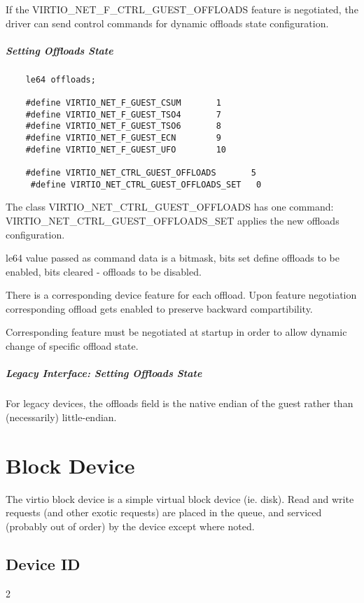 If the VIRTIO_NET_F_CTRL_GUEST_OFFLOADS feature is negotiated, the driver can
send control commands for dynamic offloads state configuration.

\subparagraph{Setting Offloads State}\label{sec:Device Types / Network Device / Device Operation / Control Virtqueue / Offloads State Configuration / Setting Offloads State}

\begin{lstlisting}
	le64 offloads;

	#define VIRTIO_NET_F_GUEST_CSUM       1
	#define VIRTIO_NET_F_GUEST_TSO4       7
	#define VIRTIO_NET_F_GUEST_TSO6       8
	#define VIRTIO_NET_F_GUEST_ECN        9
	#define VIRTIO_NET_F_GUEST_UFO        10

	#define VIRTIO_NET_CTRL_GUEST_OFFLOADS       5
	 #define VIRTIO_NET_CTRL_GUEST_OFFLOADS_SET   0
\end{lstlisting}

The class VIRTIO_NET_CTRL_GUEST_OFFLOADS has one command:
VIRTIO_NET_CTRL_GUEST_OFFLOADS_SET applies the new offloads configuration.

le64 value passed as command data is a bitmask, bits set define
offloads to be enabled, bits cleared - offloads to be disabled.

There is a corresponding device feature for each offload. Upon feature
negotiation corresponding offload gets enabled to preserve backward
compartibility.

Corresponding feature must be negotiated at startup in order to allow dynamic
change of specific offload state.


\subparagraph{Legacy Interface: Setting Offloads State}\label{sec:Device Types / Network Device / Device Operation / Control Virtqueue / Offloads State Configuration / Setting Offloads State / Legacy Interface: Setting Offloads State}
For legacy devices, the offloads field is the
native endian of the guest rather than (necessarily) little-endian.


\section{Block Device}\label{sec:Device Types / Block Device}

The virtio block device is a simple virtual block device (ie.
disk). Read and write requests (and other exotic requests) are
placed in the queue, and serviced (probably out of order) by the
device except where noted.

\subsection{Device ID}\label{sec:Device Types / Block Device / Device ID}
  2

